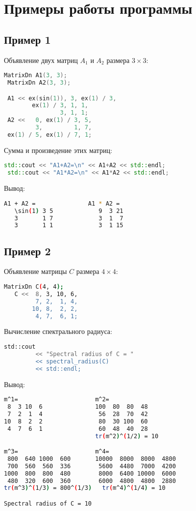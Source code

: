 \documentclass[specialist,
  substylefile = spbu.rtx,
  href,
  colorlinks=true,
  12pt]{disser}
\begin{document}
\chapter{Примеры работы программы}
\section{Пример 1}
Объявление двух матриц $A_{1}$ и $A_{2}$ размера $3\times 3$:
  \begin{lstlisting}[language=C++,basicstyle=\ttfamily,keywordstyle=\color{red}]
 MatrixDn A1(3, 3);
 MatrixDn A2(3, 3);

 A1 << ex(sin(1)), 3, ex(1) / 3,
        ex(1) / 3, 1, 1,
                3, 1, 1;
 A2 <<   0, ex(1) / 3, 5,
         3,         1, 7,
 ex(1) / 5, ex(1) / 7, 1;
  \end{lstlisting}
  Сумма и произведение этих матриц:
  \begin{lstlisting}[language=C++,basicstyle=\ttfamily,keywordstyle=\color{red}]
 std::cout << "A1+A2=\n" << A1+A2 << std::endl;
 std::cout << "A1*A2=\n" << A1*A2 << std::endl;
  \end{lstlisting}
  Вывод:
  \begin{lstlisting}[language=bash,basicstyle=\ttfamily,keywordstyle=\color{red}]
 A1 + A2 =               A1 * A2 =
   \sin(1) 3 5             9  3 21
   3       1 7             3  1  7
   3       1 1             3  1 15
  \end{lstlisting}
\section{Пример 2}
Объявление матрицы $C$ размера $4\times 4$:
  \begin{lstlisting}[language=bash,basicstyle=\ttfamily,keywordstyle=\color{red}]
   MatrixDn C(4, 4);
   C <<  8, 3, 10, 6,
         7, 2,  1, 4,
        10, 8,  2, 2,
         4, 7,  6, 1;
  \end{lstlisting}
  Вычисление спектрального радиуса:
  \begin{lstlisting}[language=bash,basicstyle=\ttfamily,keywordstyle=\color{red}]
   std::cout
         << "Spectral radius of C = "
         << spectral_radius(C)
         << std::endl;
   \end{lstlisting}
Вывод:
  \begin{lstlisting}[language=bash,basicstyle=\ttfamily,keywordstyle=\color{red}]
m^1=                      m^2=
 8  3 10  6               100  80  80  48
 7  2  1  4                56  28  70  42
10  8  2  2                80  30 100  60
 4  7  6  1                60  48  40  28
                          tr(m^2)^(1/2) = 10

m^3=                      m^4=
 800  640 1000  600       10000  8000  8000  4800
 700  560  560  336        5600  4480  7000  4200
1000  800  800  480        8000  6400 10000  6000
 480  320  600  360        6000  4800  4800  2880
tr(m^3)^(1/3) = 800^(1/3)   tr(m^4)^(1/4) = 10

Spectral radius of C = 10
\end{lstlisting}
\end{document}
